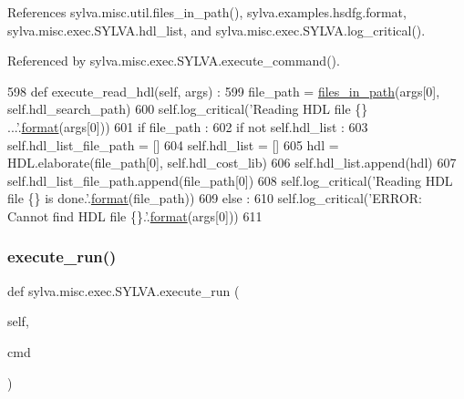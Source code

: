 References sylva.\+misc.\+util.\+files\+\_\+in\+\_\+path(), sylva.\+examples.\+hsdfg.\+format, sylva.\+misc.\+exec.\+S\+Y\+L\+V\+A.\+hdl\+\_\+list, and sylva.\+misc.\+exec.\+S\+Y\+L\+V\+A.\+log\+\_\+critical().



Referenced by sylva.\+misc.\+exec.\+S\+Y\+L\+V\+A.\+execute\+\_\+command().


\begin{DoxyCode}
598   \textcolor{keyword}{def }execute\_read\_hdl(self, args) :
599     file\_path = \hyperlink{namespacesylva_1_1misc_1_1util_a7ad460a52be16d3083cb41f0be004714}{files\_in\_path}(args[0], self.hdl\_search\_path)
600     self.log\_critical(\textcolor{stringliteral}{'Reading HDL file \{\} ...'}.\hyperlink{namespacesylva_1_1examples_1_1hsdfg_ab3510a0b8457362330aa4d9fd2209590}{format}(args[0]))
601     \textcolor{keywordflow}{if} file\_path :
602       \textcolor{keywordflow}{if} \textcolor{keywordflow}{not} self.hdl\_list :
603         self.hdl\_list\_file\_path = []
604         self.hdl\_list = []
605       hdl = HDL.elaborate(file\_path[0], self.hdl\_cost\_lib)
606       self.hdl\_list.append(hdl)
607       self.hdl\_list\_file\_path.append(file\_path[0])
608       self.log\_critical(\textcolor{stringliteral}{'Reading HDL file \{\} is done.'}.\hyperlink{namespacesylva_1_1examples_1_1hsdfg_ab3510a0b8457362330aa4d9fd2209590}{format}(file\_path))
609     \textcolor{keywordflow}{else} :
610       self.log\_critical(\textcolor{stringliteral}{'ERROR: Cannot find HDL file \{\}.'}.\hyperlink{namespacesylva_1_1examples_1_1hsdfg_ab3510a0b8457362330aa4d9fd2209590}{format}(args[0]))
611 
\end{DoxyCode}
\mbox{\label{classsylva_1_1misc_1_1exec_1_1_s_y_l_v_a_ab4675d585d77d48f755842f22f9f845a}} 
\subsubsection{\texorpdfstring{execute\+\_\+run()}{execute\_run()}}
{\footnotesize\ttfamily def sylva.\+misc.\+exec.\+S\+Y\+L\+V\+A.\+execute\+\_\+run (\begin{DoxyParamCaption}\item[{}]{self,  }\item[{}]{cmd }\end{DoxyParamCaption})}



